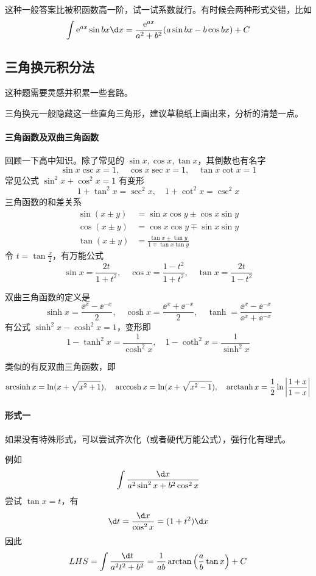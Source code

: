 这种一般答案比被积函数高一阶，试一试系数就行。有时候会两种形式交错，比如
\[ \int \ee^{ax} \sin bx \d x = \frac{\ee^{ax}}{a^2+b^2} (a \sin bx - b \cos bx) + C\]


\subsection{三角换元积分法}

这种题需要灵感并积累一些套路。

三角换元一般隐藏这一些直角三角形，建议草稿纸上画出来，分析的清楚一点。

\paragraph{三角函数及双曲三角函数}

回顾一下高中知识。除了常见的 $\sin x, \cos x, \tan x$，其倒数也有名字
\[ \sin x \csc x = 1, \quad \cos x \sec x = 1, \quad \tan x \cot x = 1 \]
常见公式 $\sin^2 x + \cos^2 x = 1$ 有变形
\[ 1 + \tan^2 x = \sec^2 x, \quad 1 + \cot^2 x = \csc^2 x \]
三角函数的和差关系
\[ \begin{aligned}
		\sin (x \pm y) & = \sin x \cos y \pm \cos x \sin y               \\
		\cos (x \pm y) & = \cos x \cos y \mp \sin x \sin y               \\
		\tan (x \pm y) & = \frac{\tan x \pm \tan y}{1 \mp \tan x \tan y}
	\end{aligned} \]
令 $t = \tan \frac{x}{2}$，有万能公式
\[ \sin x = \frac{2 t}{1 + t^2}, \quad \cos x = \frac{1 - t^2}{1 + t^2}, \quad \tan x = \frac{2t}{1-t^2} \]

双曲三角函数的定义是
\[ \sinh x = \frac{\ee^x - \ee^{-x}}{2}, \quad \cosh x = \frac{\ee^x + \ee^{-x}}{2}, \quad \tanh = \frac{\ee^x - \ee^{-x}}{\ee^x + \ee^{-x}} \]
有公式 $\sinh^2 x - \cosh^2 x = 1$，变形即
\[ 1 - \tanh^2 x = \frac{1}{\cosh^2 x}, \quad 1 - \coth^2 x = \frac{1}{\sinh^2 x} \]

类似的有反双曲三角函数，即
\[ \operatorname{arcsinh} x = \ln(x+\sqrt{x^2+1}), \quad \operatorname{arccosh} x = \ln(x+\sqrt{x^2-1}), \quad \operatorname{arctanh} x = \frac{1}{2} \ln \left| \frac{1+x}{1-x}\right| \]

\paragraph{形式一} 如果没有特殊形式，可以尝试齐次化（或者硬代万能公式），强行化有理式。

例如
\[ \int \frac{\d x}{a^2 \sin^2 x + b^2 \cos^2 x} \]
尝试 $\tan x = t$，有
\[ \d t = \frac{\d x}{\cos^2 x} = (1 + t^2) \d x \]
因此
\[ LHS = \int \frac{\d t}{a^2 t^2 + b^2} = \frac{1}{ab} \arctan \left( \frac{a}{b} \tan x \right) + C \]


